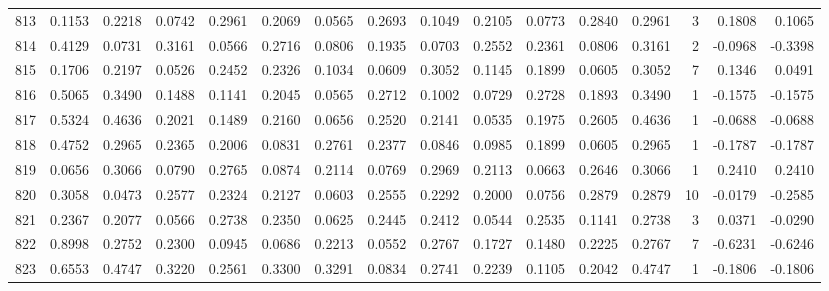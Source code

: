 \begin{tabular}{lrrrrrrrrrrrrrrr}
813 &      0.1153 &  0.2218 &  0.0742 &  0.2961 &  0.2069 &  0.0565 &  0.2693 &  0.1049 &  0.2105 &  0.0773 &   0.2840 &     0.2961 &      3 &                    0.1808 &                     0.1065 \\
814 &      0.4129 &  0.0731 &  0.3161 &  0.0566 &  0.2716 &  0.0806 &  0.1935 &  0.0703 &  0.2552 &  0.2361 &   0.0806 &     0.3161 &      2 &                   -0.0968 &                    -0.3398 \\
815 &      0.1706 &  0.2197 &  0.0526 &  0.2452 &  0.2326 &  0.1034 &  0.0609 &  0.3052 &  0.1145 &  0.1899 &   0.0605 &     0.3052 &      7 &                    0.1346 &                     0.0491 \\
816 &      0.5065 &  0.3490 &  0.1488 &  0.1141 &  0.2045 &  0.0565 &  0.2712 &  0.1002 &  0.0729 &  0.2728 &   0.1893 &     0.3490 &      1 &                   -0.1575 &                    -0.1575 \\
817 &      0.5324 &  0.4636 &  0.2021 &  0.1489 &  0.2160 &  0.0656 &  0.2520 &  0.2141 &  0.0535 &  0.1975 &   0.2605 &     0.4636 &      1 &                   -0.0688 &                    -0.0688 \\
818 &      0.4752 &  0.2965 &  0.2365 &  0.2006 &  0.0831 &  0.2761 &  0.2377 &  0.0846 &  0.0985 &  0.1899 &   0.0605 &     0.2965 &      1 &                   -0.1787 &                    -0.1787 \\
819 &      0.0656 &  0.3066 &  0.0790 &  0.2765 &  0.0874 &  0.2114 &  0.0769 &  0.2969 &  0.2113 &  0.0663 &   0.2646 &     0.3066 &      1 &                    0.2410 &                     0.2410 \\
820 &      0.3058 &  0.0473 &  0.2577 &  0.2324 &  0.2127 &  0.0603 &  0.2555 &  0.2292 &  0.2000 &  0.0756 &   0.2879 &     0.2879 &     10 &                   -0.0179 &                    -0.2585 \\
821 &      0.2367 &  0.2077 &  0.0566 &  0.2738 &  0.2350 &  0.0625 &  0.2445 &  0.2412 &  0.0544 &  0.2535 &   0.1141 &     0.2738 &      3 &                    0.0371 &                    -0.0290 \\
822 &      0.8998 &  0.2752 &  0.2300 &  0.0945 &  0.0686 &  0.2213 &  0.0552 &  0.2767 &  0.1727 &  0.1480 &   0.2225 &     0.2767 &      7 &                   -0.6231 &                    -0.6246 \\
823 &      0.6553 &  0.4747 &  0.3220 &  0.2561 &  0.3300 &  0.3291 &  0.0834 &  0.2741 &  0.2239 &  0.1105 &   0.2042 &     0.4747 &      1 &                   -0.1806 &                    -0.1806 \\

\end{tabular}
